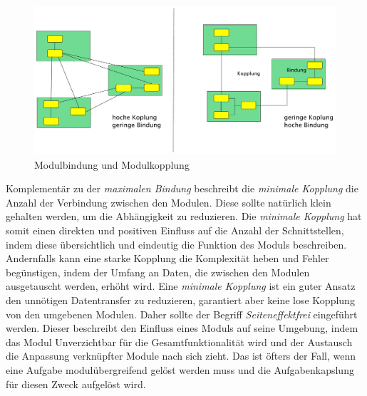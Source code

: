     \begin{figure}[h]
      \includegraphics[width=\textwidth]{material/images/kopplung.pdf}
      \caption{Modulbindung und Modulkopplung \cite{modulMitJava9}}
      \label{fig:kopplung}
    \end{figure}

    Komplementär zu der \textit{maximalen Bindung} beschreibt die \textit{minimale Kopplung} die Anzahl der Verbindung zwischen den Modulen. Diese sollte natürlich klein gehalten werden, um die Abhängigkeit zu reduzieren. Die \textit{minimale Kopplung} hat somit einen direkten und positiven Einfluss auf die Anzahl der Schnittstellen, indem diese übersichtlich und eindeutig die Funktion des Moduls beschreiben. Andernfalls kann eine starke Kopplung die Komplexität heben und Fehler begünstigen, indem der Umfang an Daten, die zwischen den Modulen ausgetauscht werden, erhöht wird. Eine \textit{minimale Kopplung} ist ein guter Ansatz den unnötigen Datentransfer zu reduzieren, garantiert aber keine lose Kopplung von den umgebenen Modulen. Daher sollte der Begriff \textit{Seiteneffektfrei} eingeführt werden. Dieser beschreibt den Einfluss eines Moduls auf seine Umgebung, indem das Modul Unverzichtbar für die Gesamtfunktionalität wird und der Austausch die Anpassung verknüpfter Module nach sich zieht. Das ist öfters der Fall, wenn eine Aufgabe modulübergreifend gelöst werden muss und die Aufgabenkapslung für diesen Zweck aufgelöst wird.\cite{softModDes,softMdDes2,modulMitJava9,java9modRevealed,modulProgJava9}

